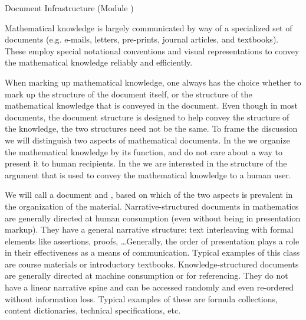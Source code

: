 
\begin{tchapter}[id=omdoc-infrastructure,short=Document Infrastructure]{Document Infrastructure (Module {})}

Mathematical knowledge is largely communicated by way of a specialized set of
documents (e.g. e-mails, letters, pre-prints, journal articles, and textbooks).
These employ special notational conventions and visual
representations to convey the mathematical knowledge reliably and efficiently.

When marking up mathematical knowledge, one always has the choice whether to mark up the
structure of the document itself, or the structure of the mathematical knowledge that is
conveyed in the document. Even though in most documents, the document structure is
designed to help convey the structure of the knowledge, the two structures need not be the
same.  To frame the discussion we will distinguish two aspects of mathematical
documents. In the {} we organize the mathematical
knowledge by its function, and do not care about a way to present it to human
recipients. In the {} we are interested in the
structure of the argument that is used to convey the mathematical knowledge to a human
user.

We will call a document {} and
{}, based on which of the
two aspects is prevalent in the organization of the material.  Narrative-structured
documents in mathematics are generally directed at human consumption (even without being
in presentation markup). They have a general narrative structure: text interleaving with
formal elements like assertions, proofs, \ldots Generally, the order of presentation plays
a role in their effectiveness as a means of communication.  Typical examples of this class
are course materials or introductory textbooks.  Knowledge-structured documents are
generally directed at machine consumption or for referencing. They do not have a linear
narrative spine and can be accessed randomly and even re-ordered without information loss.
Typical examples of these are formula collections, {\openmath} content dictionaries,
technical specifications, etc.


\end{tchapter}
